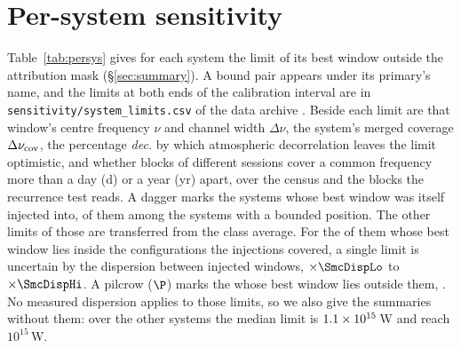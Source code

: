 \section{Per-system sensitivity}
\label{app:persys}

Table~\ref{tab:persys} gives for each system the limit of its best window
outside the attribution mask (\S\ref{sec:summary}). A bound pair appears
under its primary's name, and the limits at both ends of the calibration
interval are in \texttt{sensitivity/\allowbreak system\_limits.csv} of the
data archive \citep{SIdeposit}. Beside each limit are that window's centre
frequency $\nu$ and channel width $\Delta\nu$, the system's merged coverage
$\Delta\nu_{\rm cov}$, the percentage \emph{dec.} by which atmospheric
decorrelation leaves the limit optimistic, and whether blocks of different
sessions cover a common frequency more than a day (d) or a year (yr) apart,
over the census and the \ZcNRecEB{} blocks the recurrence test reads. A
dagger marks the \SmcNMeasSys{} systems whose best window was itself injected
into, \SmcNMeasSysBnd{} of them among the \NSysALimSum{} systems with a bounded
position. The other \SmcNEstSysBnd{} limits of those \NSysALimSum{} are transferred
from the class average. For the \NgNInterpEstSysBnd{} of them whose best window
lies inside the configurations the injections covered, a single limit is
uncertain by the dispersion between injected windows, $\times\SmcDispLo$ to
$\times\SmcDispHi$. A pilcrow ($\P$) marks the \NgNExtrapSys{}
\NgExtrapSysNoun{} whose best window lies outside them, \NgExtrapSys. No
measured dispersion applies to those limits, so we also give the summaries
without them: over the other \NgNSysInterpSum{} systems the median limit is
$1.1\times10^{15}$\,W and \NgNSysEfifteenInterp{} reach $10^{15}$\,W.

